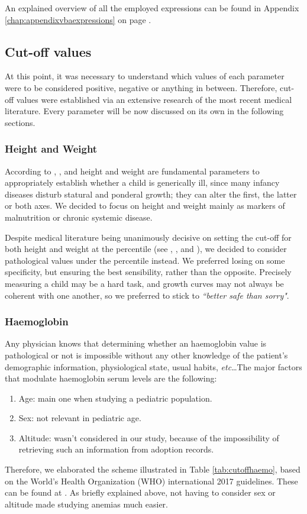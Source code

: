 An explained overview of all the employed expressions can be found in Appendix \ref{chap:appendixvbaexpressions} on page \pageref{chap:appendixvbaexpressions}.

\subsection{Cut-off values}\label{sub:cutoffvalues}
At this point, it was necessary to understand which values of each parameter were to be considered positive, negative or anything in between. Therefore, cut-off values were established via an extensive research of the most recent medical literature. Every parameter will be now discussed on its own in the following sections.

\subsubsection{Height and Weight}\label{sub:heightandweight}
According to \cite{height1}, \cite{height4}, and \cite{height5} height and weight are fundamental parameters to appropriately establish whether a child is generically ill, since many infancy diseases disturb statural and ponderal growth; they can alter the first, the latter or both axes. We decided to focus on height and weight mainly as markers of malnutrition or chronic systemic disease.

Despite medical literature being unanimously decisive on setting the cut-off for both height and weight at the  percentile (see \cite{height1}, \cite{height2}, and \cite{height3}), we decided to consider pathological values under the  percentile instead. We preferred losing on some specificity, but ensuring the best sensibility, rather than the opposite. Precisely measuring a child may be a hard task, and growth curves may not always be coherent with one another, so we preferred to stick to \textit{``better safe than sorry"}. 

\subsubsection{Haemoglobin}\label{sub:haemoglobin}
Any physician knows that determining whether an haemoglobin value is pathological or not is impossible without any other knowledge of the patient's demographic information, physiological state, usual habits, \textit{etc}\dots The major factors that modulate haemoglobin serum levels are the following:
\begin{enumerate}
	\item Age: main one when studying a pediatric population.
	\item Sex: not relevant in pediatric age.
	\item Altitude: wasn't considered in our study, because of the impossibility of retrieving such an information from adoption records.
\end{enumerate}
Therefore, we elaborated the scheme illustrated in Table \ref{tab:cutoffhaemo}, based on the World's Health Organization (WHO) international 2017 guidelines. These can be found at \cite{Hbcutoff}. As briefly explained above, not having to consider sex or altitude made studying anemias much easier.

